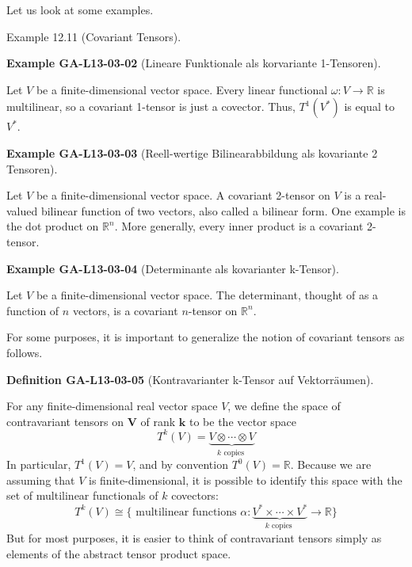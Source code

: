 \documentclass[10pt, letterpaper]{article}
\newcommand{\CustomHeading}[3]{%
  \par\medskip\noindent%
  \textbf{#1 #2} \textnormal{(#3)}.\enskip%
}
\newenvironment{DEF}[2]{\begin{unitbox}\CustomHeading{Definition}{#1}{#2}}{\end{unitbox}}
\newenvironment{EXA}[2]{\begin{unitbox}\CustomHeading{Example}{#1}{#2}}{\end{unitbox}}
\begin{document}
Let us look at some examples.


Example 12.11 (Covariant Tensors). 

\begin{EXA}{GA-L13-03-02}{Lineare Funktionale als korvariante 1-Tensoren}
Let $V$ be a finite-dimensional vector space. Every linear functional $\omega: V \rightarrow \mathbb{R}$ is multilinear, so a covariant 1-tensor is just a covector. Thus, $T^{1}\left(V^{*}\right)$ is equal to $V^{*}$.
\end{EXA}


\begin{EXA}{GA-L13-03-03}{Reell-wertige Bilinearabbildung als kovariante 2 Tensoren}
Let $V$ be a finite-dimensional vector space. A covariant 2-tensor on $V$ is a real-valued bilinear function of two vectors, also called a bilinear form. One example is the dot product on $\mathbb{R}^{n}$. More generally, every inner product is a covariant 2-tensor.
\end{EXA}


\begin{EXA}{GA-L13-03-04}{Determinante als kovarianter k-Tensor}
Let $V$ be a finite-dimensional vector space. The determinant, thought of as a function of $n$ vectors, is a covariant $n$-tensor on $\mathbb{R}^{n}$.
\end{EXA}



For some purposes, it is important to generalize the notion of covariant tensors as follows. 


\begin{DEF}{GA-L13-03-05}{Kontravarianter k-Tensor auf Vektorräumen}
For any finite-dimensional real vector space $V$, we define the space of contravariant tensors on $\boldsymbol{V}$ of rank $\boldsymbol{k}$ to be the vector space
$$
T^{k}(V)=\underbrace{V \otimes \cdots \otimes V}_{k \text { copies }}
$$
In particular, $T^{1}(V)=V$, and by convention $T^{0}(V)=\mathbb{R}$. Because we are assuming that $V$ is finite-dimensional, it is possible to identify this space with the set of multilinear functionals of $k$ covectors:
$$
T^{k}(V) \cong\{\text { multilinear functions } \alpha: \underbrace{V^{*} \times \cdots \times V^{*}}_{k \text { copies }} \rightarrow \mathbb{R}\}
$$
But for most purposes, it is easier to think of contravariant tensors simply as elements of the abstract tensor product space.
\end{DEF}
\end{document}
